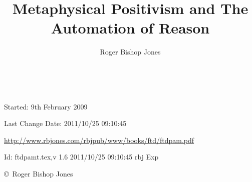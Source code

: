 \documentclass[10pt,a4paper.titlepage,openany,twocolumn]{article}
\author{Roger Bishop Jones}
\title{Metaphysical Positivism and The Automation of Reason}
\date{\ }
\begin{document}
\begin{titlepage}
\maketitle
\begin{abstract}
\end{abstract}

\vfill

\begin{centering}

{\footnotesize

Started: 9th February 2009

Last Change $ $Date: 2011/10/25 09:10:45 $ $

\href{http://www.rbjones.com/rbjpub/www/books/ftd/ftdpam.pdf}
{http://www.rbjones.com/rbjpub/www/books/ftd/ftdpam.pdf}

$ $Id: ftdpamt.tex,v 1.6 2011/10/25 09:10:45 rbj Exp $ $

\copyright\ Roger Bishop Jones

}%

\end{centering}

\thispagestyle{empty}
\end{titlepage}

\onecolumn

{\parskip=0pt\tableofcontents}

\vfill

\pagebreak

\twocolumn
\end{document}
